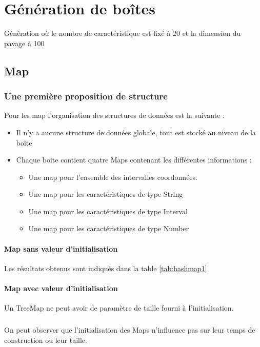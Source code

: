 \chapter{Génération de boîtes}
Génération où le nombre de caractéristique est fixé à 20 et la dimension du pavage à 100

\section{Map}

\subsection{Une première proposition de structure}
Pour les map l'organisation des structures de données est la suivante :
\begin{itemize}
\item Il n'y a aucune structure de données globale, tout est stocké au niveau de la boîte
 \item Chaque boite contient quatre Maps contenant les différentes informations :
\begin{itemize}
 \item Une map pour l'ensemble des intervalles coordonnées.
\item Une map pour les caractéristiques de type String
\item Une map pour les caractéristiques de type Interval
\item Une map pour les caractéristiques de type Number
\end{itemize}
\end{itemize}

\subsubsection{Map sans valeur d'initialisation}
Les résultats obtenus sont indiqués dans la table \ref{tab:hashmap1}







\subsubsection{Map avec valeur d'initialisation}



Un TreeMap ne peut avoir de paramètre de taille fourni à l'initialisation.

\paragraph{} On peut observer que l'initialisation des Maps n'influence pas sur leur temps de construction ou leur taille.

